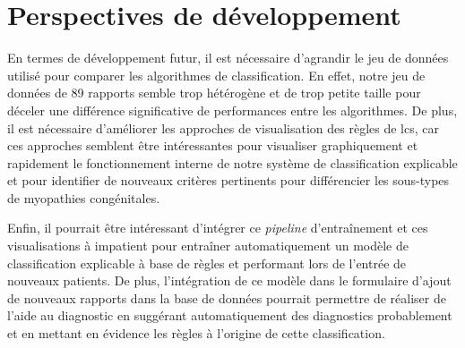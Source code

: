 \section{Perspectives de développement}
En termes de développement futur, il est nécessaire d'agrandir le jeu de données utilisé pour comparer les algorithmes de classification. En effet, notre jeu de données de 89 rapports semble trop hétérogène et de trop petite taille pour déceler une différence significative de performances entre les algorithmes. De plus, il est nécessaire d'améliorer les approches de visualisation des règles de \gls{lcs}, car ces approches semblent être intéressantes pour visualiser graphiquement et rapidement le fonctionnement interne de notre système de classification explicable et pour identifier de nouveaux critères pertinents pour différencier les sous-types de myopathies congénitales.

Enfin, il pourrait être intéressant d'intégrer ce \textit{pipeline} d'entraînement et ces visualisations à \gls{impatient} pour entraîner automatiquement un modèle de classification explicable à base de règles et performant lors de l'entrée de nouveaux patients. De plus, l'intégration de ce modèle dans le formulaire d'ajout de nouveaux rapports dans la base de données pourrait permettre de réaliser de l'aide au diagnostic en suggérant automatiquement des diagnostics probablement et en mettant en évidence les règles à l'origine de cette classification.